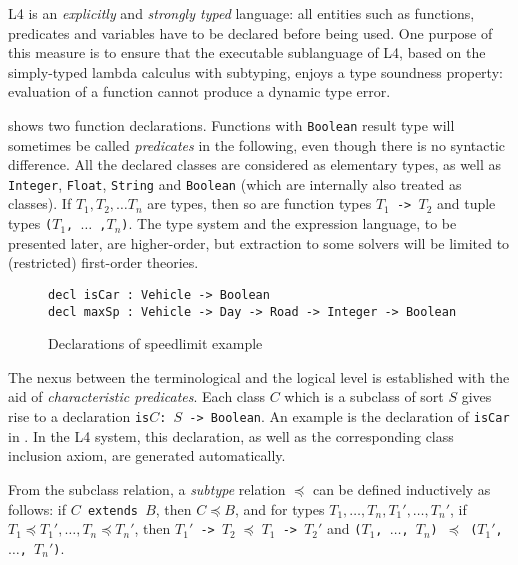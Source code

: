 L4 is an \emph{explicitly} and \emph{strongly typed} language: all entities
such as functions, predicates and variables have to be declared before being
used. One purpose of this measure is to ensure that the executable sublanguage
of L4, based on the simply-typed lambda calculus with subtyping, enjoys a type
soundness property: evaluation of a function cannot produce a dynamic type
error.

 shows two function declarations. Functions with
\texttt{Boolean} result type will sometimes be called \emph{predicates} in the
following, even though there is no syntactic difference. All the declared
classes are considered as elementary types, as well as \texttt{Integer},
\texttt{Float}, \texttt{String} and \texttt{Boolean} (which are internally also treated as
classes). If $T_1, T_2, \dots T_n$ are types, then so are function types
\texttt{$T_1$ -> $T_2$} and tuple types \texttt{($T_1$, $\dots$ ,$T_n$)}. The
type system and the expression language, to be presented later, are
higher-order, but extraction to some solvers will be limited to
(restricted) first-order theories.

\begin{figure}[h]
\begin{lstlisting}
decl isCar : Vehicle -> Boolean
decl maxSp : Vehicle -> Day -> Road -> Integer -> Boolean
\end{lstlisting}
  \caption{Declarations of speedlimit example}\label{fig:fundecls}
\end{figure}

The nexus between the terminological and the logical level is established with
the aid of \emph{characteristic predicates}. Each class $C$ which is a
subclass of sort $S$ gives rise to a declaration \texttt{is$C$: $S$ ->
  Boolean}. An example is the declaration of \texttt{isCar} in
. In the L4 system, this declaration, as well as the
corresponding class inclusion axiom, are generated
automatically.

From the subclass relation, a \emph{subtype} relation $\preceq$ can be defined
inductively as follows: if \texttt{$C$ extends $B$}, then $C \preceq B$, and
for types $T_1, \dots, T_n, T_1', \dots, T_n'$,
if $T_1 \preceq T_1', \dots, T_n \preceq T_n'$, 
then \texttt{$T_1'$ -> $T_2 \; \preceq \; T_1$ -> $T_2'$} 
and \texttt{($T_1$, $\dots$, $T_n$) $\preceq$ ($T_1'$, $\dots$, $T_n'$)}.

